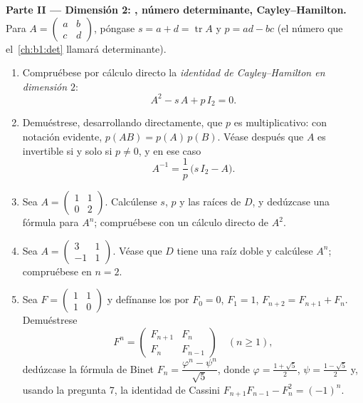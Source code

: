 \begin{problem}
\medskip
\noindent\textbf{Parte II --- Dimensión 2: , número
determinante, Cayley--Hamilton.} Para
$A = \begin{pmatrix} a & b\\ c & d\end{pmatrix}$, póngase
$s = a + d = \operatorname{tr} A$ y $p = ad - bc$ (el número que
el~\cref{ch:b1:det} llamará determinante).
\begin{enumerate}[resume]
  \item Compruébese por cálculo directo la \emph{identidad de
        Cayley--Hamilton en dimensión $2$}:
        \[
        A^2 - s\,A + p\,I_2 = 0 .
        \]
  \item Demuéstrese, desarrollando directamente, que $p$ es
        multiplicativo: con notación evidente,
        $p(AB) = p(A)\,p(B)$. Véase después que $A$ es invertible si
        y solo si $p \neq 0$, y en ese caso
        \[
        A^{-1} = \frac1p\,\bigl(s\,I_2 - A\bigr).
        \]
  \item Sea $A = \begin{pmatrix} 1 & 1\\ 0 & 2\end{pmatrix}$.
        Calcúlense $s$, $p$ y las raíces de $D$, y dedúzcase una
        fórmula  para $A^n$; compruébese con un cálculo
        directo de $A^2$.
  \item Sea $A = \begin{pmatrix} 3 & 1\\ -1 & 1\end{pmatrix}$.
        Véase que $D$ tiene una raíz doble y calcúlese $A^n$;
        compruébese en $n = 2$.
  \item Sea $F = \begin{pmatrix} 1 & 1\\ 1 & 0\end{pmatrix}$ y
        defínanse los  por $F_0 = 0$, $F_1 = 1$,
        $F_{n+2} = F_{n+1} + F_n$. Demuéstrese
        \[
        F^n = \begin{pmatrix} F_{n+1} & F_n\\ F_n &
        F_{n-1}\end{pmatrix} \quad (n \geq 1),
        \]
        dedúzcase la fórmula de Binet
        $F_n = \dfrac{\varphi^n - \psi^n}{\sqrt5}$, donde
        $\varphi = \frac{1 + \sqrt5}2$, $\psi = \frac{1 - \sqrt5}2$
        y, usando la pregunta 7, la identidad de Cassini
        $F_{n+1}F_{n-1} - F_n^2 = (-1)^n$.
\end{enumerate}


\end{problem}
